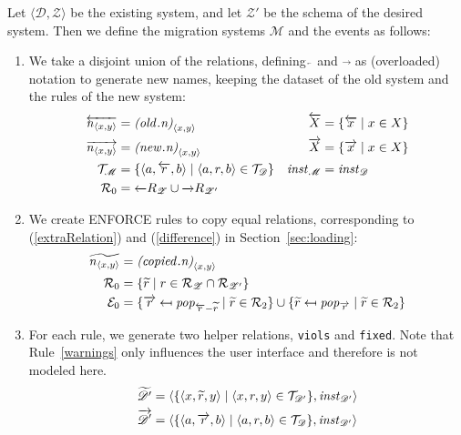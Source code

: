 \documentclass[runningheads]{llncs}
\newcommand{\id}[1]{\text{\it #1\/}}
\newcommand{\popF}[1]{\id{pop}_{#1}}
\newcommand{\instance}{\mathbin{\id{inst}}}
\newcommand{\declare}[3]{\id{#1}_{\pair{#2}{#3}}}
\newcommand{\pair}[2]{\langle{#1},{#2}\rangle}
\newcommand{\triple}[3]{\langle{#1},{#2},{#3}\rangle}
\newcommand{\rels}{\mathcal{R}}   %
\newcommand{\triples}{\mathcal{T}}
\newcommand{\enforces}{\mathcal{E}}
\newcommand{\rules}{\mathcal{U}}
\newcommand{\dataset}{\mathscr{D}}
\newcommand{\schema}{\mathscr{Z}}
\newcommand{\migrsys}{\mathscr{M}}
\begin{document}
   Let $\pair{\dataset}{\schema}$ be the existing system, and let ${\schema'}$ be the schema of the desired system.
   Then we define the migration systems $\migrsys$ and the events as follows:
\begin{enumerate}
\item We take a disjoint union of the relations, defining $\overleftarrow~$ and $\overrightarrow~$ as (overloaded) notation to generate new names, keeping the dataset of the old system and the rules of the new system:
   \begin{align}
   \overleftarrow{\declare{n}{x}{y}}&=\declare{(\id{old}.n)}{x}{y}&\overleftarrow{X} &= \{\overleftarrow{x}\mid x\in X\}\\
   \overrightarrow{\declare{n}{x}{y}}&=\declare{(\id{new}.n)}{x}{y}& \overrightarrow{X} &= \{\overrightarrow{x}\mid x\in X\}\\
   \triples_\migrsys &= \{\triple{a}{\overleftarrow{r}}{b} \mid \triple{a}{r}{b}\in\triples_\dataset\}&
   \instance_\migrsys &= \instance_\dataset\\
   \rels_\theenumi &= \overleftarrow\rels_{\schema} \cup \overrightarrow\rels_{\schema'}
   \end{align}
\item We create ENFORCE rules to copy equal relations, corresponding to (\ref{extraRelation}) and (\ref{difference}) in Section~\ref{sec:loading}:
   \begin{align}
   \widetilde{\declare{n}{x}{y}} &= \declare{(\id{copied}.n)}{x}{y}\\
   \rels_\theenumi &= \{\widetilde{r}\mid r \in \rels_\schema \cap \rels_{\schema'}\}\\
   \enforces_\theenumi &= \{\overrightarrow{r}\mapsfrom \popF{\overleftarrow{r} - \widetilde{r}} \mid \widetilde{r} \in \rels_2\} \cup \{\widetilde{r}\mapsfrom \popF{\overrightarrow{r}} \mid \widetilde{r} \in \rels_2\}
   \end{align}
\item For each rule, we generate two helper relations, {\tt viols} and {\tt fixed}. Note that Rule~\ref{warnings} only influences the user interface and therefore is not modeled here.
   \begin{align}
   \widetilde{\dataset'} &= \pair{\{\triple{x}{\widetilde{r}}{y}\mid \triple{x}{r}{y} \in \triples_{\dataset'}\}}{\instance_{\dataset'}}\\
   \overrightarrow{\dataset'} &= \pair{\{\triple{a}{\overrightarrow{r}}{b} \mid \triple{a}{r}{b}\in\triples_\dataset\}}{\instance_{\dataset'}} \\

\end{align}
\end{enumerate}
\end{document}
